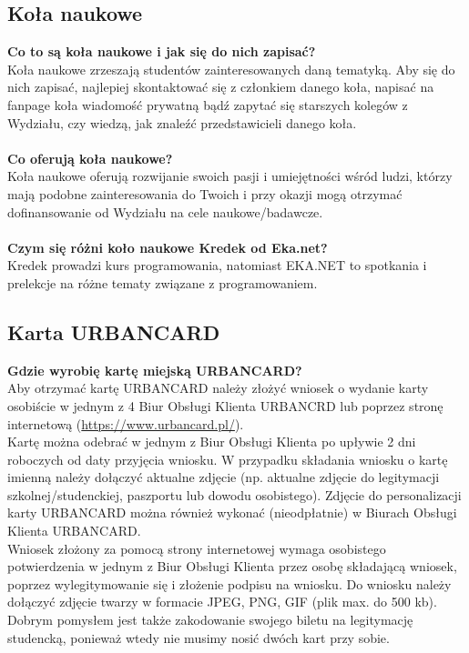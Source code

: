 \documentclass[11pt]{article}
\begin{document}
\subsection{Koła naukowe}
\textbf{Co to są koła naukowe i jak się do nich zapisać?} \\
\indent Koła naukowe zrzeszają studentów zainteresowanych daną tematyką. Aby się do nich zapisać, najlepiej skontaktować się z członkiem danego koła, napisać na fanpage koła wiadomość prywatną bądź zapytać się starszych kolegów z Wydziału, czy wiedzą, jak znaleźć przedstawicieli danego koła. \\\\
\textbf{Co oferują koła naukowe?} \\
\indent Koła naukowe oferują rozwijanie swoich pasji i umiejętności wśród ludzi, którzy mają podobne zainteresowania do Twoich i przy okazji mogą otrzymać dofinansowanie od Wydziału na cele naukowe/badawcze. \\\\
\textbf{Czym się różni koło naukowe Kredek od Eka.net?} \\
\indent Kredek prowadzi kurs programowania, natomiast EKA.NET to spotkania i prelekcje na różne tematy związane z programowaniem.
\subsection{Karta URBANCARD}
\textbf{Gdzie wyrobię kartę miejską URBANCARD?} \\
\indent Aby otrzymać kartę URBANCARD należy złożyć wniosek o wydanie karty osobiście w jednym z 4 Biur Obsługi Klienta URBANCRD lub poprzez stronę internetową ({\color{blue}\url{https://www.urbancard.pl/}}). \\
\indent Kartę można odebrać w jednym z Biur Obsługi Klienta po upływie 2 dni roboczych od daty przyjęcia wniosku. W przypadku składania wniosku o kartę imienną należy dołączyć aktualne zdjęcie (np. aktualne zdjęcie do legitymacji szkolnej/studenckiej, paszportu lub dowodu osobistego). Zdjęcie do personalizacji karty URBANCARD można również wykonać (nieodpłatnie) w Biurach Obsługi Klienta URBANCARD. \\
\indent Wniosek złożony za pomocą strony internetowej wymaga osobistego potwierdzenia w jednym z Biur Obsługi Klienta przez osobę składającą wniosek, poprzez wylegitymowanie się i złożenie podpisu na wniosku. Do wniosku należy dołączyć zdjęcie twarzy w formacie JPEG, PNG, GIF (plik max. do 500 kb). \\
\indent Dobrym pomysłem jest także zakodowanie swojego biletu na legitymację studencką, ponieważ wtedy nie musimy nosić dwóch kart przy sobie.
\end{document}
